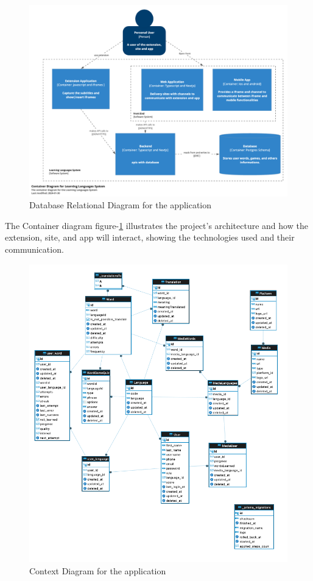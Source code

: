 \documentclass[12pt]{article}
\begin{document}
\begin{figure}
  \centering
  \caption{
  Database Relational Diagram for the application
  }
  \label{fig:container_diagram}
  \includegraphics[width=1\textwidth]{assets/24.png}
\end{figure}



The Container diagram figure-\ref{fig:container_diagram} illustrates the project's architecture and how the extension, site, and app will interact, showing the technologies used and their communication.

\begin{figure}
  \centering
  \caption{
  Context Diagram for the application
  }
  \label{fig:database_diagram}
  \includegraphics[width=1\textwidth]{assets/23.png}
\end{figure}
\end{document}
